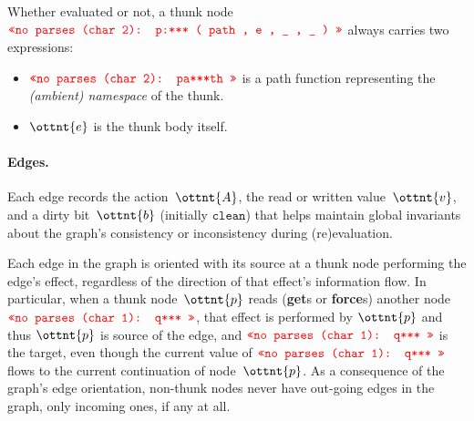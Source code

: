 \documentclass[11pt]{article}
\renewcommand{\ottkw}[1]{\mathtt{#1}}
\begin{document}
Whether evaluated or not, a thunk node~$\texttt{\textcolor{red}{<<no parses (char 2): p:*** ( path , e , \_ , \_ ) >>}}$ always
carries two expressions:
\begin{itemize}
\item $\texttt{\textcolor{red}{<<no parses (char 2): pa***th >>}}$ is a path function representing the \emph{(ambient) namespace} of the thunk.
\item $\ottnt{e}$ is the thunk body itself.
\end{itemize}

\paragraph{Edges.}
%
Each edge records the action~$\ottnt{A}$, the read or
written value~$\ottnt{v}$, and a dirty bit~$\ottnt{b}$ (initially $\ottkw{clean}$)
that helps maintain global invariants about the graph's consistency or
inconsistency during (re)evaluation.

Each edge in the graph is oriented with its source at a thunk node
performing the edge's effect, regardless of the direction of that
effect's information flow.
%
In particular, when a thunk node~$\ottnt{p}$ reads (\textbf{get}s or
\textbf{force}s) another node~$\texttt{\textcolor{red}{<<no parses (char 1): q*** >>}}$, that effect is performed by
$\ottnt{p}$ and thus $\ottnt{p}$ is source of the edge, and $\texttt{\textcolor{red}{<<no parses (char 1): q*** >>}}$ is the
target, even though the current value of $\texttt{\textcolor{red}{<<no parses (char 1): q*** >>}}$ flows to the current
continuation of node~$\ottnt{p}$.
%
As a consequence of the graph's edge orientation, non-thunk nodes
never have out-going edges in the graph, only incoming ones, if any at
all.
\end{document}
